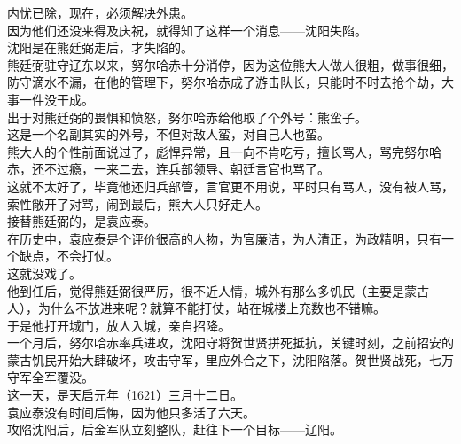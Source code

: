 \begin{multicols}{\theparacolNo}
内忧已除，现在，必须解决外患。\\

因为他们还没来得及庆祝，就得知了这样一个消息——沈阳失陷。\\

沈阳是在熊廷弼走后，才失陷的。\\

熊廷弼驻守辽东以来，努尔哈赤十分消停，因为这位熊大人做人很粗，做事很细，防守滴水不漏，在他的管理下，努尔哈赤成了游击队长，只能时不时去抢个劫，大事一件没干成。\\

出于对熊廷弼的畏惧和愤怒，努尔哈赤给他取了个外号：熊蛮子。\\

这是一个名副其实的外号，不但对敌人蛮，对自己人也蛮。\\

熊大人的个性前面说过了，彪悍异常，且一向不肯吃亏，擅长骂人，骂完努尔哈赤，还不过瘾，一来二去，连兵部领导、朝廷言官也骂了。\\

这就不太好了，毕竟他还归兵部管，言官更不用说，平时只有骂人，没有被人骂，索性敞开了对骂，闹到最后，熊大人只好走人。\\

接替熊廷弼的，是袁应泰。\\

在历史中，袁应泰是个评价很高的人物，为官廉洁，为人清正，为政精明，只有一个缺点，不会打仗。\\

这就没戏了。\\

他到任后，觉得熊廷弼很严厉，很不近人情，城外有那么多饥民（主要是蒙古人），为什么不放进来呢？就算不能打仗，站在城楼上充数也不错嘛。\\

于是他打开城门，放人入城，亲自招降。\\

一个月后，努尔哈赤率兵进攻，沈阳守将贺世贤拼死抵抗，关键时刻，之前招安的蒙古饥民开始大肆破坏，攻击守军，里应外合之下，沈阳陷落。贺世贤战死，七万守军全军覆没。\\

这一天，是天启元年（1621）三月十二日。\\

袁应泰没有时间后悔，因为他只多活了六天。\\

攻陷沈阳后，后金军队立刻整队，赶往下一个目标——辽阳。\\


\end{multicols}

